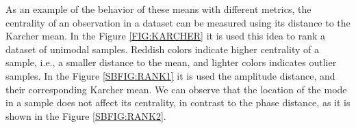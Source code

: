 As an example of the behavior of these means with different metrics,
the centrality of an observation in a dataset  can be measured using its
distance to the Karcher mean. In the Figure \ref{FIG:KARCHER} it is used this idea to rank a dataset of
unimodal samples. Reddish colors indicate higher centrality of a sample, i.e.,
a smaller distance to the mean, and lighter colors indicates outlier samples.
In the Figure \ref{SBFIG:RANK1} it is used the amplitude distance, and their
corresponding Karcher mean. We can observe that the location of the mode in a
sample does not affect its centrality, in contrast to the phase distance,
as it is shown in the Figure \ref{SBFIG:RANK2}.
